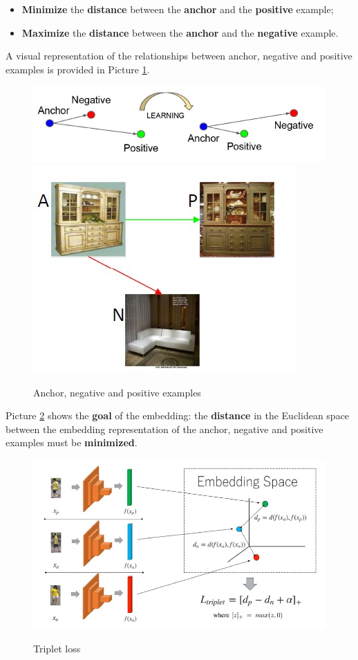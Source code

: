 \begin{itemize}
    \item \textbf{Minimize} the \textbf{distance} between the \textbf{anchor} and the \textbf{positive} example;
    \item \textbf{Maximize} the \textbf{distance} between the \textbf{anchor} and the \textbf{negative} example.
\end{itemize}

A visual representation of the relationships between anchor, negative and positive examples is provided in Picture \ref{camc11_12}.

\begin{figure}[h!]
    \centering
    \includegraphics[scale = 1.2]{img/camc11.jpg}
    \includegraphics[scale = 1.5]{img/camc12.jpg}
    \label{camc11_12}
    \caption{Anchor, negative and positive examples}
\end{figure}

Picture \ref{camc13} shows the \textbf{goal} of the embedding: the \textbf{distance} in the Euclidean space between the embedding representation of the anchor, negative and positive examples must be \textbf{minimized}.

\begin{figure}[h!]
    \centering
    \includegraphics[scale = 1.4]{img/camc13.jpg}
    \label{camc13}
    \caption{Triplet loss}
\end{figure}

